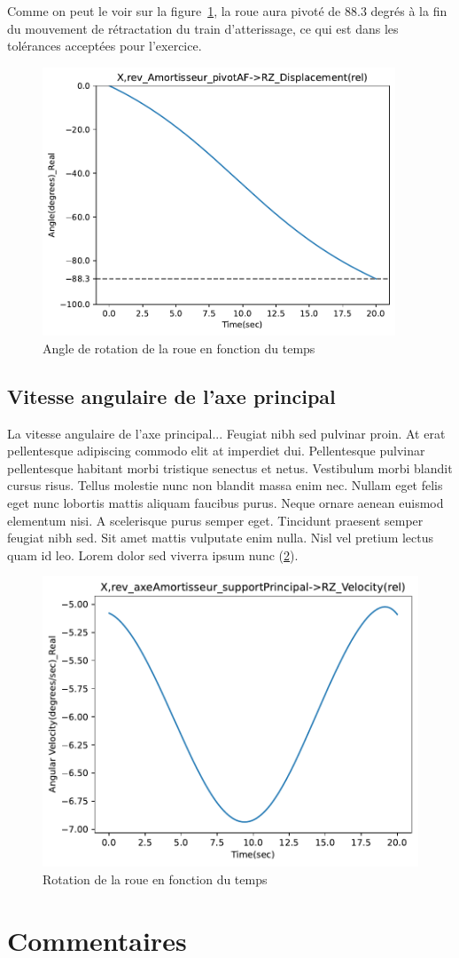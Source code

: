\documentclass{article}
\begin{document}
Comme on peut le voir sur la figure~\ref{fig:wheel_rotation_angle}, la roue aura pivoté de 88.3 degrés à la fin du mouvement de rétractation du train d'atterissage, ce qui est dans les tolérances acceptées pour l'exercice.
\begin{figure}[h]
    \centering 
    \includegraphics[height=8cm]{data/displacement_angle_amortisseur.pdf}
    \caption{Angle de rotation de la roue en fonction du temps}
    \label{fig:wheel_rotation_angle}
\end{figure}

\subsection{Vitesse angulaire de l'axe principal}

La vitesse angulaire de l'axe principal...
Feugiat nibh sed pulvinar proin. At erat pellentesque adipiscing commodo elit at imperdiet dui. Pellentesque pulvinar pellentesque habitant morbi tristique senectus et netus. Vestibulum morbi blandit cursus risus. Tellus molestie nunc non blandit massa enim nec. Nullam eget felis eget nunc lobortis mattis aliquam faucibus purus. Neque ornare aenean euismod elementum nisi. A scelerisque purus semper eget. Tincidunt praesent semper feugiat nibh sed. Sit amet mattis vulputate enim nulla. Nisl vel pretium lectus quam id leo. Lorem dolor sed viverra ipsum nunc (\ref{fig:speed_main_axis}).

\begin{figure}[h]
    \includegraphics{data/velocity_axeAmortisseur.pdf}
    \caption{Rotation de la roue en fonction du temps}
    \label{fig:speed_main_axis}
\end{figure}

\section{Commentaires}
\end{document}
